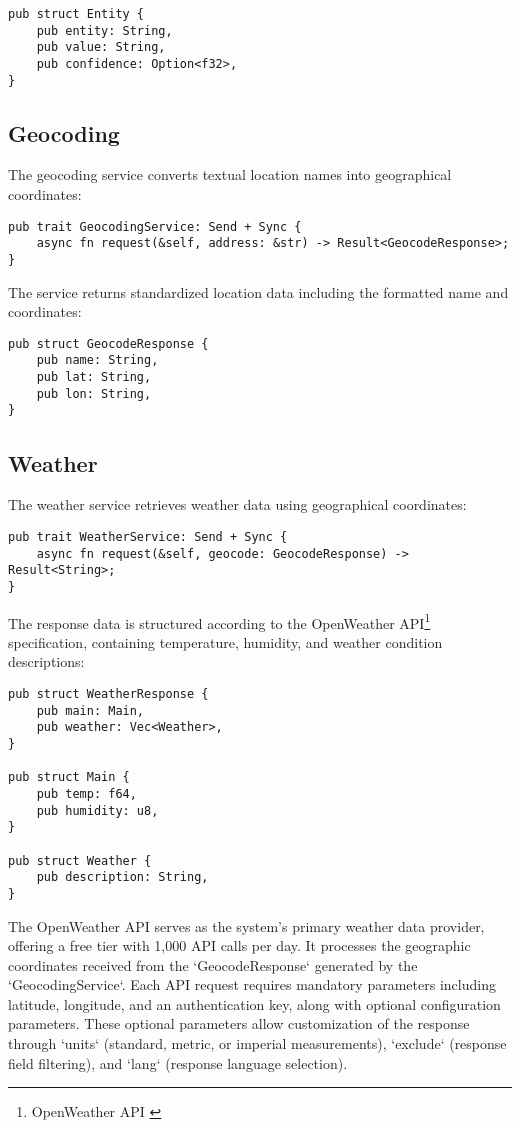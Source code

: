 \begin{verbatim}
pub struct Entity {
    pub entity: String,
    pub value: String,
    pub confidence: Option<f32>,
}
\end{verbatim}

\subsection{Geocoding}
The geocoding service converts textual location names into geographical coordinates:

\begin{verbatim}
pub trait GeocodingService: Send + Sync {
    async fn request(&self, address: &str) -> Result<GeocodeResponse>;
}
\end{verbatim}

The service returns standardized location data including the formatted name and coordinates:

\begin{verbatim}
pub struct GeocodeResponse {
    pub name: String,
    pub lat: String,
    pub lon: String,
}
\end{verbatim}

\subsection{Weather}
The weather service retrieves weather data using geographical coordinates:

\begin{verbatim}
pub trait WeatherService: Send + Sync {
    async fn request(&self, geocode: GeocodeResponse) -> Result<String>;
}
\end{verbatim}

The response data is structured according to the OpenWeather API\footnote{OpenWeather API \cite{openweathermap}} specification,
containing temperature, humidity, and weather condition descriptions:

\begin{verbatim}
pub struct WeatherResponse {
    pub main: Main,
    pub weather: Vec<Weather>,
}

pub struct Main {
    pub temp: f64,
    pub humidity: u8,
}

pub struct Weather {
    pub description: String,
}
\end{verbatim}

The OpenWeather API serves as the system's primary weather data provider, offering a free tier with 1,000 API calls per day.
It processes the geographic coordinates received from the `GeocodeResponse` generated by the `GeocodingService`.
Each API request requires mandatory parameters including latitude, longitude, and an authentication key, along with optional configuration parameters.
These optional parameters allow customization of the response through `units` (standard, metric, or imperial measurements),
`exclude` (response field filtering), and `lang` (response language selection).

